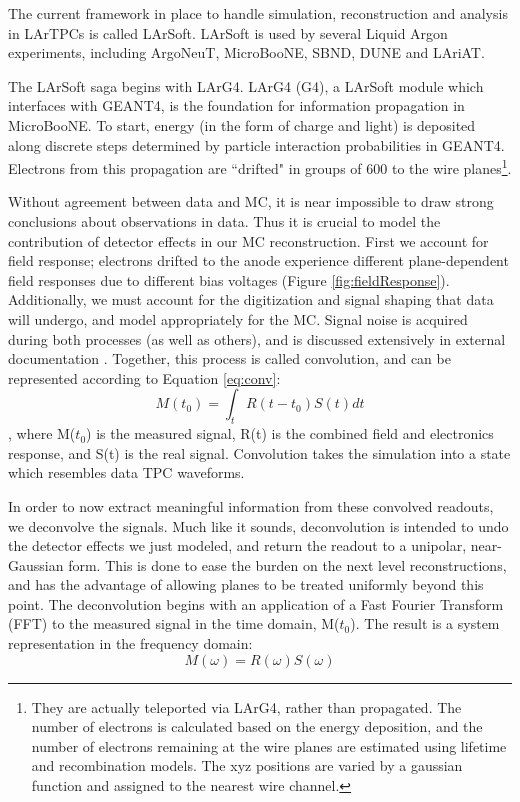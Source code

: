 \documentclass[12pt]{article}
\begin{document}
\par The current framework in place to handle simulation, reconstruction and analysis in LArTPCs is called LArSoft. LArSoft is used by several Liquid Argon experiments, including ArgoNeuT, MicroBooNE, SBND, DUNE and LAriAT. 
\par The LArSoft saga begins with LArG4. LArG4 (G4), a LArSoft module which interfaces with GEANT4, is the foundation for information propagation in MicroBooNE. To start, energy (in the form of charge and light) is deposited along discrete steps determined by particle interaction probabilities in GEANT4.  Electrons from this propagation are ``drifted" in groups of 600 to the wire planes\footnote{They are actually teleported via LArG4, rather than propagated. The number of electrons is calculated based on the energy deposition, and the number of electrons remaining at the wire planes are estimated using lifetime and recombination models.  The xyz positions are varied by a gaussian function and assigned to the nearest wire channel. }. 
\par Without agreement between data and MC, it is near impossible to draw strong conclusions about observations in data.  Thus it is crucial to model the contribution of detector effects in our MC reconstruction.  First we account for field response; electrons drifted to the anode experience different plane-dependent field responses due to different bias voltages (Figure \ref{fig:fieldResponse}). Additionally, we must account for the digitization and signal shaping that data will undergo, and model appropriately for the MC. Signal noise is acquired during both processes (as well as others), and is discussed extensively in external documentation \cite{bib:noise}.  Together, this process is called convolution, and can be represented according to Equation \ref{eq:conv}:
\begin{equation}
\label{eq:conv}
M(t_0) = \int_{t} R(t - t_0) S(t) dt
\end{equation}
, where M($t_0$) is the measured signal, R(t) is the combined field and electronics response, and S(t) is the real signal.  Convolution takes the simulation into a state which resembles data TPC waveforms.  
\par In order to now extract meaningful information from these convolved readouts, we deconvolve the signals.  Much like it sounds, deconvolution is intended to undo the detector effects we just modeled, and return the readout to a unipolar, near-Gaussian form. This is done to ease the burden on the next level reconstructions, and has the advantage of allowing planes to be treated uniformly beyond this point. The deconvolution begins with an application of a Fast Fourier Transform (FFT) to the measured signal in the time domain, M($t_0$). The result is a system representation in the frequency domain:
\begin{equation}
M(\omega) = R(\omega)S(\omega) 
\end{equation}
\end{document}
